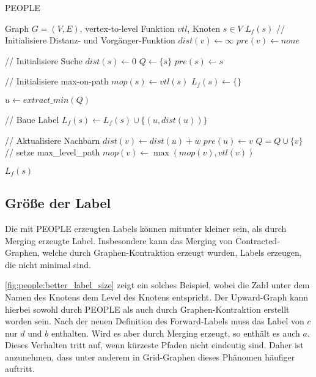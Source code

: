 \begin{algorithm}[p]
  \caption{PEOPLE}
  \begin{algorithmic}[1]
    \Require Graph $G = (V, E)$, vertex-to-level Funktion ${vtl}$, Knoten $s \in V$
    \Ensure $L_f (s)$
    \State // Initialisiere Distanz- und Vorgänger-Funktion
    \State ${dist}(v) \leftarrow \infty$
    \State ${pre}(v) \leftarrow {none}$
    \EndFor

    \State
    \State // Initialisiere Suche
    \State ${dist}(s) \leftarrow 0$
    \State $Q\leftarrow \{ s \}$
    \State ${pre}(s) \leftarrow s$

    \State
    \State // Initialisiere max-on-path
    \State ${mop}(s) \leftarrow {vtl}(s)$
    \State $L_f (s) \leftarrow \{ \}$

    \State
    \State $u \leftarrow{extract\_min}(Q)$

    \State
    \State // Baue Label
    \State $L_f (s) \leftarrow L_f (s) \cup \{ (u, {dist}(u)) \}$
    \EndIf

    \State
    \State // Aktualisiere Nachbarn
    \State ${dist}(v) \leftarrow {dist}(u) + w$
    \State ${pre}(u) \leftarrow v$
    \State $Q = Q \cup \{ v \}$
    \State
    \State // setze max\_level\_path
    \State ${mop}(v) \leftarrow \max({mop}(v), {vtl}(v))$
    \EndIf
    \EndFor

    \EndWhile

    \State
    \State \Return $L_f (s)$
  \end{algorithmic}
  \label{alg:people:people}
\end{algorithm}

\subsection{Größe der Label}\label{subsection:people:label_size}

Die mit PEOPLE erzeugten Labels können mitunter kleiner sein, als durch Merging erzeugte Label.
Insbesondere kann das Merging von Contracted-Graphen, welche durch Graphen-Kontraktion erzeugt wurden, Labels erzeugen, die nicht minimal sind.

\autoref{fig:people:better_label_size} zeigt ein solches Beispiel, wobei die Zahl unter dem Namen des Knotens dem Level des Knotens entspricht.
Der Upward-Graph kann hierbei sowohl durch PEOPLE als auch durch Graphen-Kontraktion erstellt worden sein.
Nach der neuen Definition des Forward-Labels muss das Label von $c$ nur $d$ und $b$ enthalten.
Wird es aber durch Merging erzeugt, so enthält es auch $a$.
Dieses Verhalten tritt auf, wenn kürzeste Pfaden nicht eindeutig sind.
Daher ist anzunehmen, dass unter anderem in Grid-Graphen dieses Phänomen häufiger auftritt.

